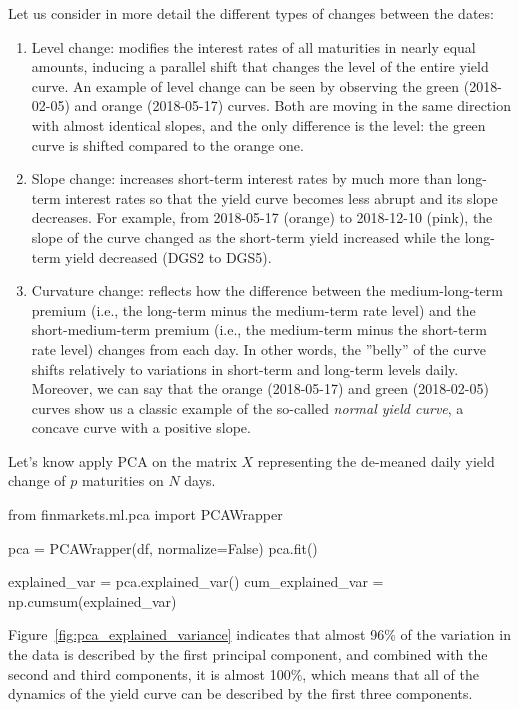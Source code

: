 Let us consider in more detail the different types of changes between the dates:
\begin{enumerate}
\item Level change: modifies the interest rates of all maturities in nearly equal amounts, inducing a parallel shift that changes the level of the entire yield curve. An example of level change can be seen by observing the green (2018-02-05) and orange (2018-05-17) curves. Both are moving in the same direction with almost identical slopes, and the only difference is the level: the green curve is shifted compared to the orange one.
\item Slope change: increases short-term interest rates by much more than long-term interest rates so that the yield curve becomes less abrupt and its slope decreases.
For example, from 2018-05-17 (orange) to 2018-12-10 (pink), the slope of the curve changed as the short-term yield increased while the long-term yield decreased (DGS2 to DGS5).
\item Curvature change: reflects how the difference between the medium-long-term premium (i.e., the long-term minus the medium-term rate level) and the short-medium-term premium (i.e., the medium-term minus the short-term rate level) changes from each day. In other words, the ”belly” of the curve shifts relatively to variations in short-term and long-term levels daily. Moreover, we can say that the orange (2018-05-17) and green (2018-02-05) curves show us a classic example of the so-called \emph{normal yield curve}, a concave curve with a positive slope.
\end{enumerate}

Let's know apply PCA on the matrix $X$ representing the de-meaned daily yield change of $p$ maturities on $N$ days.

\begin{ipython}
from finmarkets.ml.pca import PCAWrapper

pca = PCAWrapper(df, normalize=False)
pca.fit()

explained_var = pca.explained_var()
cum_explained_var = np.cumsum(explained_var)
\end{ipython}

Figure~\ref{fig:pca_explained_variance} indicates that almost 96\% of the variation in the data is described by the first principal component, and combined with the second and third components, it is almost 100\%, which means that all of the dynamics of the yield curve can be described by the first three components.


